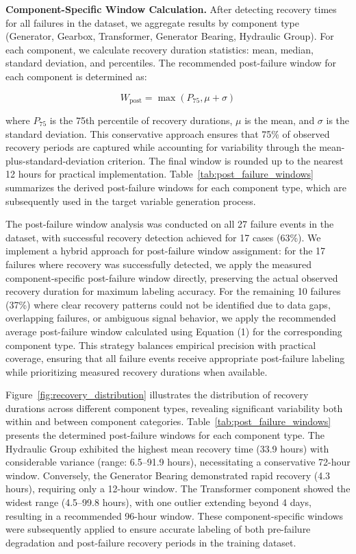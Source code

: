 \documentclass[12pt]{article}
\begin{document}
\textbf{Component-Specific Window Calculation.} After detecting recovery times for all failures in the dataset, we aggregate results by component type (Generator, Gearbox, Transformer, Generator Bearing, Hydraulic Group). For each component, we calculate recovery duration statistics: mean, median, standard deviation, and percentiles. The recommended post-failure window for each component is determined as:

\begin{equation}
W_{\text{post}} = \max(P_{75}, \mu + \sigma)
\end{equation}

where $P_{75}$ is the 75th percentile of recovery durations, $\mu$ is the mean, and $\sigma$ is the standard deviation. This conservative approach ensures that 75\% of observed recovery periods are captured while accounting for variability through the mean-plus-standard-deviation criterion. The final window is rounded up to the nearest 12 hours for practical implementation. Table~\ref{tab:post_failure_windows} summarizes the derived post-failure windows for each component type, which are subsequently used in the target variable generation process.

The post-failure window analysis was conducted on all 27 failure events in the dataset, with successful recovery detection achieved for 17 cases (63\%). We implement a hybrid approach for post-failure window assignment: for the 17 failures where recovery was successfully detected, we apply the measured component-specific post-failure window directly, preserving the actual observed recovery duration for maximum labeling accuracy. For the remaining 10 failures (37\%) where clear recovery patterns could not be identified due to data gaps, overlapping failures, or ambiguous signal behavior, we apply the recommended average post-failure window calculated using Equation (1) for the corresponding component type. This strategy balances empirical precision with practical coverage, ensuring that all failure events receive appropriate post-failure labeling while prioritizing measured recovery durations when available.

Figure~\ref{fig:recovery_distribution} illustrates the distribution of recovery durations across different component types, revealing significant variability both within and between component categories. Table~\ref{tab:post_failure_windows} presents the determined post-failure windows for each component type. The Hydraulic Group exhibited the highest mean recovery time (33.9 hours) with considerable variance (range: 6.5--91.9 hours), necessitating a conservative 72-hour window. Conversely, the Generator Bearing demonstrated rapid recovery (4.3 hours), requiring only a 12-hour window. The Transformer component showed the widest range (4.5--99.8 hours), with one outlier extending beyond 4 days, resulting in a recommended 96-hour window. These component-specific windows were subsequently applied to ensure accurate labeling of both pre-failure degradation and post-failure recovery periods in the training dataset.
\end{document}
